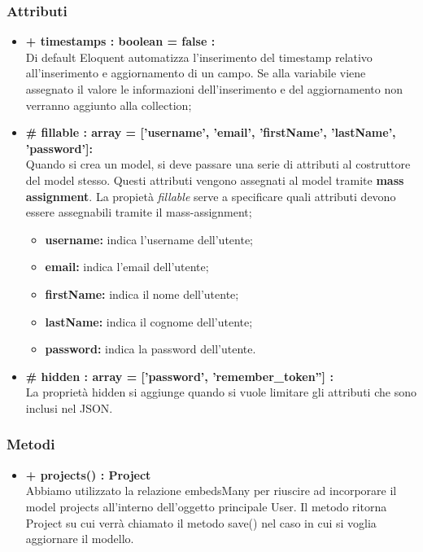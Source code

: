 	\subsubsection*{Attributi}
	\begin{itemize}
		\item \textbf{+ timestamps : boolean = false :}\\
		Di default Eloquent automatizza l'inserimento del timestamp relativo all'inserimento e aggiornamento di un campo. Se alla variabile viene assegnato il valore le informazioni dell'inserimento e del aggiornamento non verranno aggiunto alla collection;
		\item \textbf{\# fillable : array = ['username', 'email', 'firstName', 'lastName', 'password']:}\\
		Quando si crea un model, si deve passare una serie di attributi al costruttore del model stesso. Questi attributi vengono assegnati al model tramite \textbf{mass assignment}. La propietà \textit{fillable} serve a specificare quali attributi devono essere assegnabili tramite il mass-assignment;

		\begin{itemize}
			\item \textbf{username:} indica l'username dell'utente;
			\item \textbf{email:} indica l'email dell'utente;
			\item \textbf{firstName:} indica il nome dell'utente;
			\item \textbf{lastName:} indica il cognome dell'utente;
			\item \textbf{password:} indica la password dell'utente.
		\end{itemize}
		
		\item \textbf{\# hidden : array = ['password', 'remember\_token''] : }\\
		La proprietà hidden si aggiunge quando si vuole limitare gli attributi che sono inclusi nel JSON.
	\end{itemize}
	\subsubsection*{Metodi}
	\begin{itemize}
		\item \textbf{+ projects() : Project}\\
		Abbiamo utilizzato la relazione embedsMany per riuscire ad incorporare il model projects all'interno dell'oggetto principale User. Il metodo ritorna Project su cui verrà chiamato il metodo save() nel caso in cui si voglia aggiornare il modello.
	\end{itemize}
	

